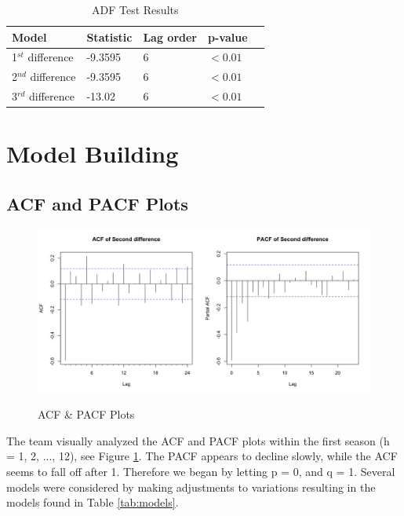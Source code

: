 \documentclass[twoside,twocolumn]{article}
\begin{document}
	 \begin{table}[H]
		 \centering
		 \caption{ADF Test Results}
		 \label{tab:ADF}
		 \begin{tabular}{lllll}
		 \hline
		 \textbf{Model} & \textbf{Statistic} & \textbf{Lag order} & \textbf{p-value}\\ \hline
		  1\(^{st}\) difference &  -9.3595 & 6 &\( < 0.01\)\\
		  2\(^{nd}\) difference &  -9.3595 & 6 & \( < 0.01\)\\			  
		  3\(^{rd}\) difference &  -13.02 & 6 & \( < 0.01\)\\		 \hline
		 \end{tabular}
		 \end{table}

  



\section{Model Building}

\subsection{ACF and PACF Plots}
  
  \begin{figure}[H]
    	\centering
     	\caption{ACF \& PACF Plots}
     	\includegraphics[width=\linewidth]{images/acfpacf}
     	\label{fig:secdiff2}
      \end{figure}
      
      The team visually analyzed the ACF and PACF plots within the first season (h = 1, 2, ..., 12), see Figure \ref{fig:secdiff2}. The PACF appears to decline slowly, while the ACF seems to fall off after 1. Therefore we began by letting p = 0, and q = 1. Several models were considered by making adjustments to variations resulting in the models found in Table \ref{tab:models}.\newline
      
\end{document}
